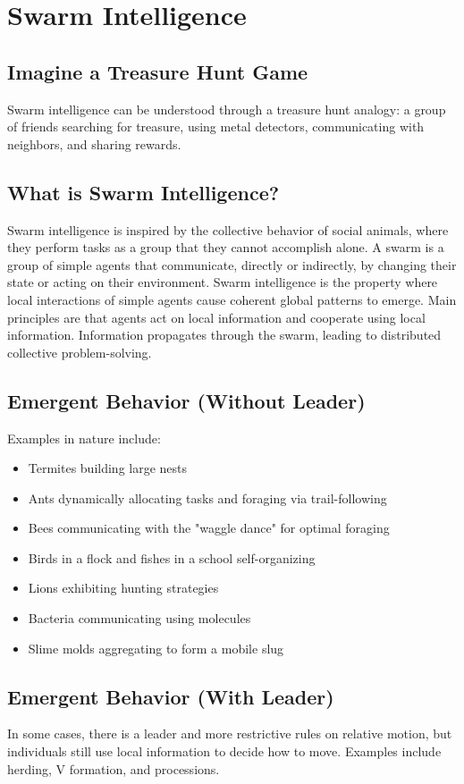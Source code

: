 \section{Swarm Intelligence}
\subsection*{Imagine a Treasure Hunt Game}
Swarm intelligence can be understood through a treasure hunt analogy: a group of friends searching for treasure, using metal detectors, communicating with neighbors, and sharing rewards.

\subsection*{What is Swarm Intelligence?}
Swarm intelligence is inspired by the collective behavior of social animals, where they perform tasks as a group that they cannot accomplish alone.  A swarm is a group of simple agents that communicate, directly or indirectly, by changing their state or acting on their environment. Swarm intelligence is the property where local interactions of simple agents cause coherent global patterns to emerge. Main principles are that agents act on local information and cooperate using local information. Information propagates through the swarm, leading to distributed collective problem-solving.

\subsection*{Emergent Behavior (Without Leader)}
Examples in nature include:
\begin{itemize}
    \item  Termites building large nests
    \item  Ants dynamically allocating tasks and foraging via trail-following
    \item  Bees communicating with the "waggle dance" for optimal foraging
    \item Birds in a flock and fishes in a school self-organizing
    \item Lions exhibiting hunting strategies
     \item Bacteria communicating using molecules
    \item Slime molds aggregating to form a mobile slug
\end{itemize}

\subsection*{Emergent Behavior (With Leader)}
In some cases, there is a leader and more restrictive rules on relative motion, but individuals still use local information to decide how to move. Examples include herding, V formation, and processions.

